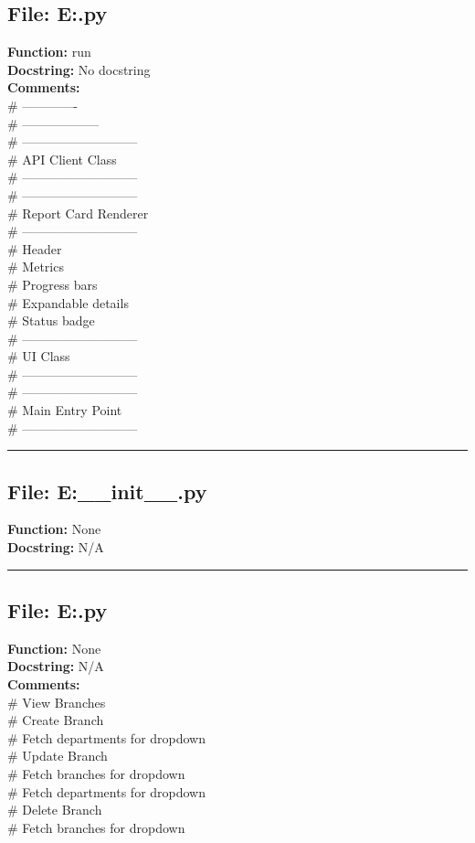{\subsection*{File: E:\project\capstone\frontend\view.py}
\textbf{Function:} run\\
\textbf{Docstring:} No docstring\\
\textbf{Comments:}\\
# -------------\\
# ------------------\\
# ---------------------------\\
# API Client Class\\
# ---------------------------\\
# ---------------------------\\
# Report Card Renderer\\
# ---------------------------\\
# Header\\
# Metrics\\
# Progress bars\\
# Expandable details\\
# Status badge\\
# ---------------------------\\
# UI Class\\
# ---------------------------\\
# ---------------------------\\
# Main Entry Point\\
# ---------------------------\\

\hrule

\subsection*{File: E:\project\capstone\frontend\__init__.py}
\textbf{Function:} None\\
\textbf{Docstring:} N/A\\

\hrule

\subsection*{File: E:\project\capstone\frontend\admin\branch.py}
\textbf{Function:} None\\
\textbf{Docstring:} N/A\\
\textbf{Comments:}\\
# View Branches\\
# Create Branch\\
# Fetch departments for dropdown\\
# Update Branch\\
# Fetch branches for dropdown\\
# Fetch departments for dropdown\\
# Delete Branch\\
# Fetch branches for dropdown\\

}
